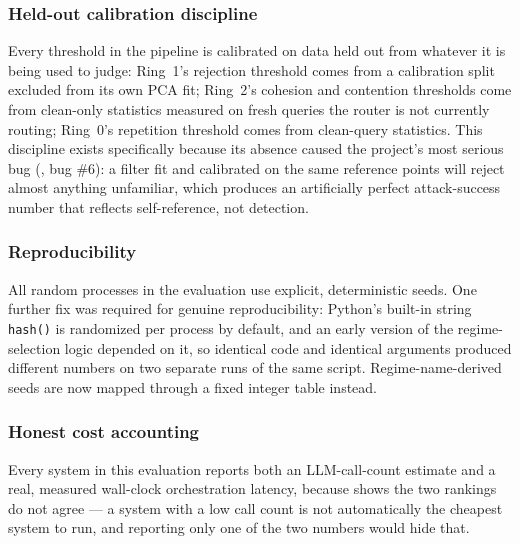 \subsubsection{Held-out calibration discipline}

Every threshold in the pipeline is calibrated on data held out from
whatever it is being used to judge: Ring~1's rejection threshold comes
from a calibration split excluded from its own PCA fit; Ring~2's cohesion
and contention thresholds come from clean-only statistics measured on
fresh queries the router is not currently routing; Ring~0's repetition
threshold comes from clean-query statistics. This discipline exists
specifically because its absence caused the project's most serious bug
(, bug \#6): a filter fit and calibrated on the same
reference points will reject almost anything unfamiliar, which produces
an artificially perfect attack-success number that reflects
self-reference, not detection.

\subsubsection{Reproducibility}

All random processes in the evaluation use explicit, deterministic
seeds. One further fix was required for genuine reproducibility:
Python's built-in string \texttt{hash()} is randomized per process by
default, and an early version of the regime-selection logic depended on
it, so identical code and identical arguments produced different numbers
on two separate runs of the same script. Regime-name-derived seeds are
now mapped through a fixed integer table instead.

\subsubsection{Honest cost accounting}

Every system in this evaluation reports both an LLM-call-count estimate
and a real, measured wall-clock orchestration latency, because
 shows the two rankings do not agree --- a system
with a low call count is not automatically the cheapest system to run,
and reporting only one of the two numbers would hide that.

